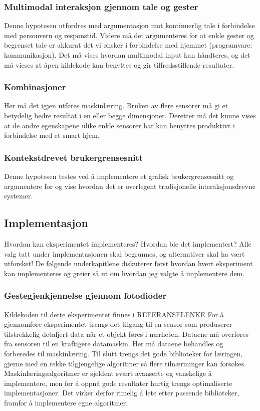 \subsubsection*{Multimodal interaksjon gjennom tale og gester}
Denne hypotesen utfordres med argumentasjon mot kontinuerlig tale i forbindelse med personvern og responstid. Videre må det argumenteres for at enkle gester og begrenset tale er akkurat det vi ønsker i forbindelse med hjemmet (programvare: kommunikasjon). Det må vises hvordan multimodal input kan håndteres, og det må vieses at åpen kildekode kan benyttes og gir tilfredsstillende resultater.

\subsubsection*{Kombinasjoner}
Her må det igjen utføres maskinlæring. Bruken av flere sensorer må gi et betydelig bedre resultat i en eller begge dimensjoner. Deretter må det kunne vises at de andre egenskapene ulike enkle sensorer har kan benyttes produktivt i forbindelse med et smart hjem.

\subsubsection*{Kontekstdrevet brukergrensesnitt}
Denne hypotesen testes ved å implementere et grafisk brukergrensesnitt og argumentere for og vise hvordan det er overlegent tradisjonelle interaksjonsdrevne systemer.





\subsection{Implementasjon}
{\color{red}Hvordan kan eksperimentet implementeres? Hvordan ble det implementert? Alle valg tatt under implementasjonen skal begrunnes, og alternativer skal ha vært utforsket!}
De følgende underkapitlene diskuterer først hvordan hvert eksperiment kan implementeres og greier så ut om hvordan jeg valgte å implementere dem.

\subsubsection{Gestegjenkjennelse gjennom fotodioder}
{\color{red}Kildekoden til dette eksperimentet finnes i REFERANSELENKE}
For å gjennomføre eksperimentet trengs det tilgang til en sensor som produserer tilstrekkelig detaljert data når et objekt føres i nærheten. Dataene må overføres fra sensoren til en kraftigere datamaskin. Her må dataene behandles og forberedes til maskinlæring. Til slutt trengs det gode biblioteker for læringen, gjerne med en rekke tilgjengelige algoritmer så flere tilnærminger kan forsøkes. Maskinlæringsalgoritmer er sjeldent svært avanserte og vanskelige å implementere, men for å oppnå gode resultater hurtig trengs optimaliserte implementasjoner. Det virker derfor rimelig å lete etter passende biblioteker, framfor å implementere egne algoritmer.

